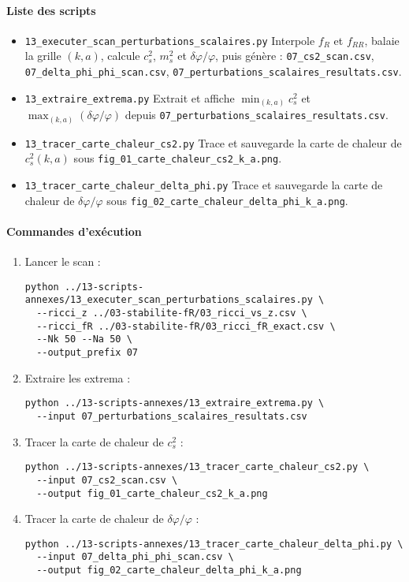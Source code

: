 \paragraph{Liste des scripts}
\begin{itemize}
  \item \texttt{13\_executer\_scan\_perturbations\_scalaires.py}  
        Interpole \(f_{R}\) et \(f_{RR}\), balaie la grille \((k,a)\), calcule \(c_{s}^{2}\), \(m_{s}^{2}\) et \(\delta\varphi/\varphi\), puis génère :
        \texttt{07\_cs2\_scan.csv},  
        \texttt{07\_delta\_phi\_phi\_scan.csv},  
        \texttt{07\_perturbations\_scalaires\_resultats.csv}.
  \item \texttt{13\_extraire\_extrema.py}  
        Extrait et affiche  
        \(\min_{(k,a)}c_{s}^{2}\) et \(\max_{(k,a)}(\delta\varphi/\varphi)\)  
        depuis \texttt{07\_perturbations\_scalaires\_resultats.csv}.
  \item \texttt{13\_tracer\_carte\_chaleur\_cs2.py}  
        Trace et sauvegarde la carte de chaleur de \(c_{s}^{2}(k,a)\) sous  
        \texttt{fig\_01\_carte\_chaleur\_cs2\_k\_a.png}.
  \item \texttt{13\_tracer\_carte\_chaleur\_delta\_phi.py}  
        Trace et sauvegarde la carte de chaleur de \(\delta\varphi/\varphi\) sous  
        \texttt{fig\_02\_carte\_chaleur\_delta\_phi\_k\_a.png}.
\end{itemize}

\paragraph*{Commandes d’exécution}
\begin{enumerate}
  \item Lancer le scan :
\begin{verbatim}
python ../13-scripts-annexes/13_executer_scan_perturbations_scalaires.py \
  --ricci_z ../03-stabilite-fR/03_ricci_vs_z.csv \
  --ricci_fR ../03-stabilite-fR/03_ricci_fR_exact.csv \
  --Nk 50 --Na 50 \
  --output_prefix 07
\end{verbatim}
  \item Extraire les extrema :
\begin{verbatim}
python ../13-scripts-annexes/13_extraire_extrema.py \
  --input 07_perturbations_scalaires_resultats.csv
\end{verbatim}
  \item Tracer la carte de chaleur de \(c_{s}^{2}\) :
\begin{verbatim}
python ../13-scripts-annexes/13_tracer_carte_chaleur_cs2.py \
  --input 07_cs2_scan.csv \
  --output fig_01_carte_chaleur_cs2_k_a.png
\end{verbatim}
  \item Tracer la carte de chaleur de \(\delta\varphi/\varphi\) :
\begin{verbatim}
python ../13-scripts-annexes/13_tracer_carte_chaleur_delta_phi.py \
  --input 07_delta_phi_phi_scan.csv \
  --output fig_02_carte_chaleur_delta_phi_k_a.png
\end{verbatim}
\end{enumerate}


